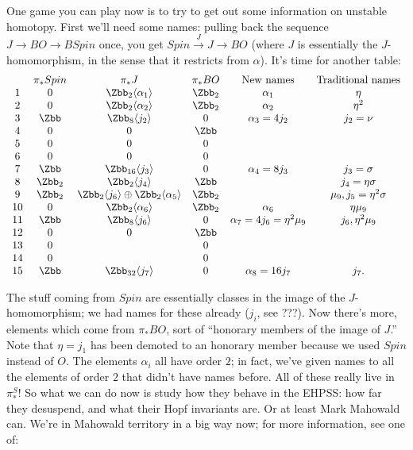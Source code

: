 One game you can play now is to try to get out some information on unstable homotopy.  First we'll need some names: pulling back the sequence $J \to BO \to BSpin$ once, you get $Spin \stackrel{J}{\to} J \to BO$ (where $J$ is essentially the $J$-homomorphism, in the sense that it restricts from $\alpha$).  It's time for another table:
\[
\begin{array}{cccccc}
& \pi_* Spin & \pi_* J & \pi_* BO & \hbox{New names} & \hbox{Traditional names} \\
1 & 0 & \Zbb_2 \langle \alpha_1 \rangle & \Zbb_2 & \alpha_1 & \eta \\
2 & 0 & \Zbb_2 \langle \alpha_2 \rangle & \Zbb_2 & \alpha_2 & \eta^2 \\
3 & \Zbb & \Zbb_8 \langle j_2  \rangle & 0 & \alpha_3 = 4 j_2 & j_2 = \nu \\
4 & 0 & 0 & \Zbb \\
5 & 0 & 0 & 0 \\
6 & 0 & 0 & 0 \\
7 & \Zbb & \Zbb_{16} \langle j_3 \rangle & 0 & \alpha_4 = 8j_3 & j_3 = \sigma \\
8 & \Zbb_2 & \Zbb_2 \langle j_4 \rangle & \Zbb & & j_4 = \eta \sigma \\
9 & \Zbb_2 & \Zbb_2 \langle j_6 \rangle \oplus \Zbb_2 \langle \alpha_5 \rangle & \Zbb_2 & & \mu_9, j_5 = \eta^2 \sigma \\
10 & 0 & \Zbb_2 \langle \alpha_6 \rangle & \Zbb_2 & \alpha_6 & \eta \mu_9 \\
11 & \Zbb & \Zbb_8 \langle j_6 \rangle & 0 & \alpha_7 = 4 j_6 = \eta^2 \mu_9 & j_6, \eta^2 \mu_9 \\
12 & 0 & 0 & \Zbb \\
13 & 0 & & 0 \\
14 & 0 & & 0 \\
15 & \Zbb & \Zbb_{32} \langle j_7 \rangle & 0 & \alpha_8 = 16j_7 & j_7.
\end{array}
\]

The stuff coming from $Spin$ are essentially classes in the image of the $J$-homomorphism; we had names for these already ($j_i$, see ???).  Now there's more, elements which come from $\pi_* BO$, sort of ``honorary members of the image of $J$.''  Note that $\eta = j_1$ has been demoted to an honorary member because we used $Spin$ instead of $O$.  The elements $\alpha_i$ all have order $2$; in fact, we've given names to all the elements of order $2$ that didn't have names before.  All of these really live in $\pi_*^S$!  So what we can do now is study how they behave in the EHPSS: how far they desuspend, and what their Hopf invariants are.  Or at least Mark Mahowald can.  We're in Mahowald territory in a big way now; for more information, see one of:

